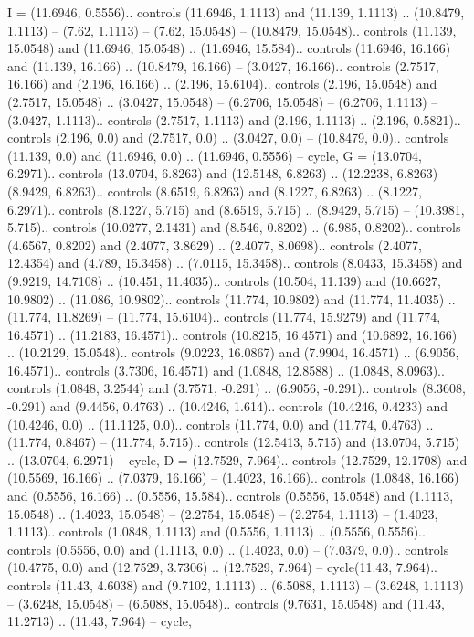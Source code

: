 {I} = {(11.6946, 0.5556).. controls (11.6946, 1.1113) and (11.139, 1.1113) .. (10.8479, 1.1113) -- (7.62, 1.1113) -- (7.62, 15.0548) -- (10.8479, 15.0548).. controls (11.139, 15.0548) and (11.6946, 15.0548) .. (11.6946, 15.584).. controls (11.6946, 16.166) and (11.139, 16.166) .. (10.8479, 16.166) -- (3.0427, 16.166).. controls (2.7517, 16.166) and (2.196, 16.166) .. (2.196, 15.6104).. controls (2.196, 15.0548) and (2.7517, 15.0548) .. (3.0427, 15.0548) -- (6.2706, 15.0548) -- (6.2706, 1.1113) -- (3.0427, 1.1113).. controls (2.7517, 1.1113) and (2.196, 1.1113) .. (2.196, 0.5821).. controls (2.196, 0.0) and (2.7517, 0.0) .. (3.0427, 0.0) -- (10.8479, 0.0).. controls (11.139, 0.0) and (11.6946, 0.0) .. (11.6946, 0.5556) -- cycle},
{G} = {(13.0704, 6.2971).. controls (13.0704, 6.8263) and (12.5148, 6.8263) .. (12.2238, 6.8263) -- (8.9429, 6.8263).. controls (8.6519, 6.8263) and (8.1227, 6.8263) .. (8.1227, 6.2971).. controls (8.1227, 5.715) and (8.6519, 5.715) .. (8.9429, 5.715) -- (10.3981, 5.715).. controls (10.0277, 2.1431) and (8.546, 0.8202) .. (6.985, 0.8202).. controls (4.6567, 0.8202) and (2.4077, 3.8629) .. (2.4077, 8.0698).. controls (2.4077, 12.4354) and (4.789, 15.3458) .. (7.0115, 15.3458).. controls (8.0433, 15.3458) and (9.9219, 14.7108) .. (10.451, 11.4035).. controls (10.504, 11.139) and (10.6627, 10.9802) .. (11.086, 10.9802).. controls (11.774, 10.9802) and (11.774, 11.4035) .. (11.774, 11.8269) -- (11.774, 15.6104).. controls (11.774, 15.9279) and (11.774, 16.4571) .. (11.2183, 16.4571).. controls (10.8215, 16.4571) and (10.6892, 16.166) .. (10.2129, 15.0548).. controls (9.0223, 16.0867) and (7.9904, 16.4571) .. (6.9056, 16.4571).. controls (3.7306, 16.4571) and (1.0848, 12.8588) .. (1.0848, 8.0963).. controls (1.0848, 3.2544) and (3.7571, -0.291) .. (6.9056, -0.291).. controls (8.3608, -0.291) and (9.4456, 0.4763) .. (10.4246, 1.614).. controls (10.4246, 0.4233) and (10.4246, 0.0) .. (11.1125, 0.0).. controls (11.774, 0.0) and (11.774, 0.4763) .. (11.774, 0.8467) -- (11.774, 5.715).. controls (12.5413, 5.715) and (13.0704, 5.715) .. (13.0704, 6.2971) -- cycle},
{D} = {(12.7529, 7.964).. controls (12.7529, 12.1708) and (10.5569, 16.166) .. (7.0379, 16.166) -- (1.4023, 16.166).. controls (1.0848, 16.166) and (0.5556, 16.166) .. (0.5556, 15.584).. controls (0.5556, 15.0548) and (1.1113, 15.0548) .. (1.4023, 15.0548) -- (2.2754, 15.0548) -- (2.2754, 1.1113) -- (1.4023, 1.1113).. controls (1.0848, 1.1113) and (0.5556, 1.1113) .. (0.5556, 0.5556).. controls (0.5556, 0.0) and (1.1113, 0.0) .. (1.4023, 0.0) -- (7.0379, 0.0).. controls (10.4775, 0.0) and (12.7529, 3.7306) .. (12.7529, 7.964) -- cycle(11.43, 7.964).. controls (11.43, 4.6038) and (9.7102, 1.1113) .. (6.5088, 1.1113) -- (3.6248, 1.1113) -- (3.6248, 15.0548) -- (6.5088, 15.0548).. controls (9.7631, 15.0548) and (11.43, 11.2713) .. (11.43, 7.964) -- cycle},
